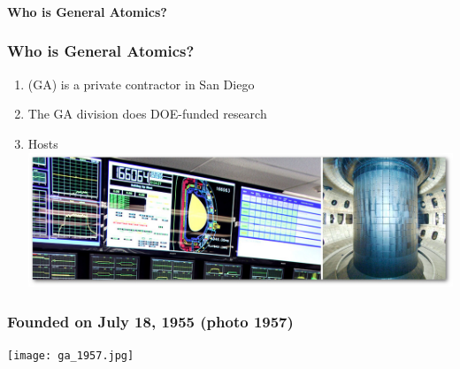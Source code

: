 
\begin{frame}
  \frametitle{}
  \begin{center}
    \textbf{\Large Who is General Atomics?}
  \end{center}
\end{frame}


\begin{frame}
  \frametitle{Who is General Atomics?}
\begin{enumerate}
\item<1->  (GA) is a private contractor in San Diego
\item<2-> The GA  division does DOE-funded research 
\item<3->{Hosts \\
\includegraphics[width=5in]{figures/plasma_control.jpg}}
\end{enumerate}
\end{frame}


\begin{frame}
  \frametitle{Founded on July 18, 1955 (photo 1957)\\
    }
  \begin{center}
    \vspace{-3mm}
   \texttt{[image: ga\_1957.jpg]}
  \end{center}
\end{frame}


